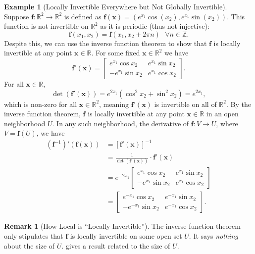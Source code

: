 \documentclass{article}
\newcommand{\R}{\mathbb{R}}
\newcommand{\x}{\mathbf{x}}
\newcommand{\f}{\mathbf{f}}
\newcommand{\Z}{\mathbb{Z}}
\theoremstyle{definition}
\newtheorem{example}{Example}[section]
\newtheorem{remark}{Remark}[section]
\begin{document}
\begin{example}[Locally Invertible Everywhere but Not Globally Invertible]
	Suppose $ \f:\R^2\to\R^2 $ is defined as $ \f(\x)=(e^{x_1}\cos(x_2),e^{x_1}\sin(x_2)) $. This function is not invertible on $ \R^2 $ as it is periodic (thus not injective):
	$$ \f(x_1,x_2) = \f(x_1, x_2+2\pi n)\ \ \ \forall n\in \Z.$$ Despite this, we can use the inverse function theorem to show that $ \f $ is locally invertible at any point $ \x\in \R $. For some fixed $ \x\in \R^2 $ we have $$ \f'(\x)=\begin{bmatrix}
		e^{x_1}\cos x_2 & e^{x_1}\sin x_2 \\
		-e^{x_1}\sin x_2 & e^{x_1}\cos x_2
	\end{bmatrix}. $$ For all $ \x\in\R $, $$ \det(\f'(\x)) = e^{2x_1}(\cos^2x_2 + \sin^2x_2)= e^{2x_1} ,$$ which is non-zero for all $ \x\in \R^2 $, meaning $ \f'(\x) $ is invertible on all of $ \R^2 $. By the inverse function theorem, $ \f $ is locally invertible at any point $ \x\in \R $ in an open neighborhood $ U $. In any such neighborhood, the derivative of $ \f:V\to U $, where $ V=\f(U) $, we have 
\begin{align*}
	(\f^{-1})'(\f(\x)) &= [\f'(\x)]^{-1}\\
							& =\frac{1}{\det(\f'(\x))}\cdot \f'(\x)\\
							& = e^{-2x_1}\begin{bmatrix}
								e^{x_1}\cos x_2 & e^{x_1}\sin x_2 \\
								-e^{x_1}\sin x_2 & e^{x_1}\cos x_2
							\end{bmatrix}\\
						& = \begin{bmatrix}
							e^{-x_1}\cos x_2 & e^{-x_1}\sin x_2 \\
							-e^{-x_1}\sin x_2 & e^{-x_1}\cos x_2
						\end{bmatrix}.
						\end{align*}
\end{example}
\begin{remark}[How Local is ``Locally Invertible'']
	The inverse function theorem only stipulates that $ \f $ is locally invertible on some open set $ U $. It says \textit{nothing} about the size of $ U $. \cite{lang2012real} gives a result related to the size of $ U $.  
\end{remark}
\end{document}
